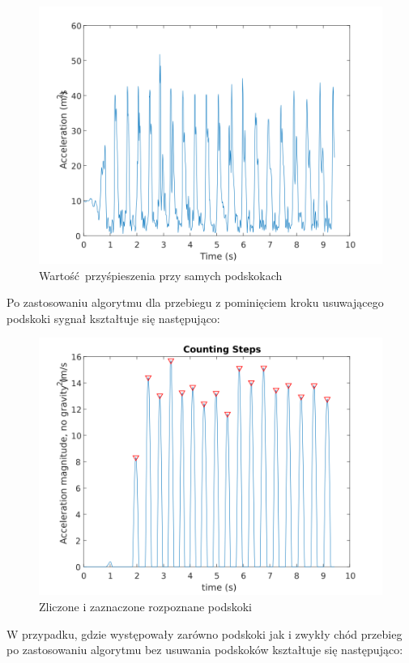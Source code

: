 \documentclass[a4paper, 12pt, titlepage]{article}
\begin{document}
        \begin{figure}[H]
            \centering
            \includegraphics[width=0.8\columnwidth]
                {skok1.png}
            \caption{Wartość przyśpieszenia przy samych podskokach}
        \end{figure}\noindent
        Po zastosowaniu algorytmu dla przebiegu z pominięciem kroku
        usuwającego podskoki sygnał kształtuje się następująco:
        \begin{figure}[H]
            \centering
            \includegraphics[width=0.8\columnwidth]
                {skok1_2.png}
            \caption{Zliczone i zaznaczone rozpoznane podskoki}
        \end{figure}\noindent
        W przypadku, gdzie występowały zarówno podskoki jak i zwykły
        chód przebieg po zastosowaniu algorytmu bez usuwania podskoków
        kształtuje się następująco:
\end{document}
